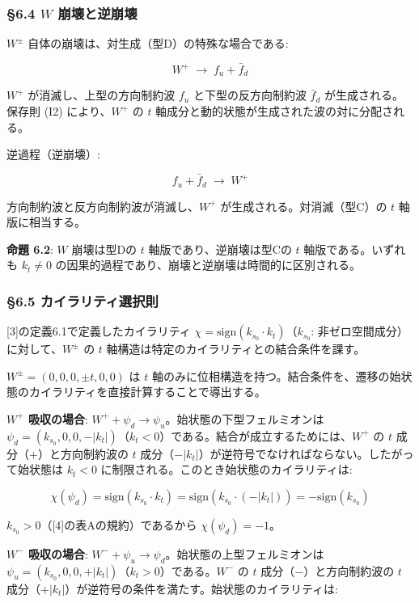 \documentclass[
  a4paper,11pt]{ltjsarticle}
\theoremstyle{definition}
\theoremstyle{remark}
\begin{document}
\subsubsection{\texorpdfstring{§6.4 \(W\)
崩壊と逆崩壊}{§6.4 W 崩壊と逆崩壊}}\label{w-ux5d29ux58caux3068ux9006ux5d29ux58ca}

\(W^{\pm}\) 自体の崩壊は、対生成（型D）の特殊な場合である:

\[W^+ \;\longrightarrow\; f_u + \bar{f}_d\]

\(W^+\) が消滅し、上型の方向制約波 \(f_u\) と下型の反方向制約波
\(\bar{f}_d\) が生成される。保存則 (I2) により、\(W^+\) の \(t\)
軸成分と動的状態が生成された波の対に分配される。

逆過程（逆崩壊）:

\[f_u + \bar{f}_d \;\longrightarrow\; W^+\]

方向制約波と反方向制約波が消滅し、\(W^+\) が生成される。対消滅（型C）の
\(t\) 軸版に相当する。

\textbf{命題 6.2}: \(W\) 崩壊は型Dの \(t\) 軸版であり、逆崩壊は型Cの
\(t\) 軸版である。いずれも \(k_t \neq 0\)
の因果的過程であり、崩壊と逆崩壊は時間的に区別される。

\subsubsection{§6.5
カイラリティ選択則}\label{ux30abux30a4ux30e9ux30eaux30c6ux30a3ux9078ux629eux5247}

{[}3{]}の定義6.1で定義したカイラリティ
\(\chi = \mathrm{sign}(k_{s_0} \cdot k_t)\)（\(k_{s_0}\):
非ゼロ空間成分）に対して、\(W^{\pm}\) の \(t\)
軸構造は特定のカイラリティとの結合条件を課す。

\(W^{\pm} = (0, 0, 0, \pm t, 0, 0)\) は \(t\)
軸のみに位相構造を持つ。結合条件を、遷移の始状態のカイラリティを直接計算することで導出する。

\textbf{\(W^+\) 吸収の場合}:
\(W^+ + \psi_d \to \psi_u\)。始状態の下型フェルミオンは
\(\psi_d = (k_{s_0}, 0, 0, -|k_t|)\)（\(k_t < 0\)）である。結合が成立するためには、\(W^+\)
の \(t\) 成分（\(+\)）と方向制約波の \(t\)
成分（\(-|k_t|\)）が逆符号でなければならない。したがって始状態は
\(k_t < 0\) に制限される。このとき始状態のカイラリティは:

\[\chi(\psi_d) = \mathrm{sign}(k_{s_0} \cdot k_t) = \mathrm{sign}(k_{s_0} \cdot (-|k_t|)) = -\mathrm{sign}(k_{s_0})\]

\(k_{s_0} > 0\)（{[}4{]}の表Aの規約）であるから \(\chi(\psi_d) = -1\)。

\textbf{\(W^-\) 吸収の場合}:
\(W^- + \psi_u \to \psi_d\)。始状態の上型フェルミオンは
\(\psi_u = (k_{s_0}, 0, 0, +|k_t|)\)（\(k_t > 0\)）である。\(W^-\) の
\(t\) 成分（\(-\)）と方向制約波の \(t\)
成分（\(+|k_t|\)）が逆符号の条件を満たす。始状態のカイラリティは:
\end{document}
